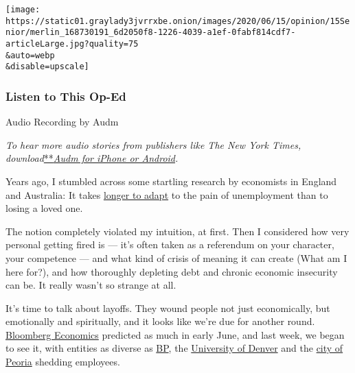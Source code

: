 \texttt{[image: https://static01.graylady3jvrrxbe.onion/images/2020/06/15/opinion/15Senior/merlin\_168730191\_6d2050f8-1226-4039-a1ef-0fabf814cdf7-articleLarge.jpg?quality=75\\\&auto=webp\\\&disable=upscale]}

\hypertarget{listen-to-this-op-ed}{%
\subsubsection{Listen to This Op-Ed}\label{listen-to-this-op-ed}}

Audio Recording by Audm

\emph{To hear more audio stories from publishers like The New York
Times,
download}\href{https://www.audm.com/?utm_source=nytmag\&utm_medium=embed\&utm_campaign=left_behind_draper}{**}\href{https://www.audm.com/?utm_source=nytopinion\&utm_medium=embed\&utm_campaign=more_fired_pandemic}{\emph{Audm
for iPhone or Android}}\emph{.}

Years ago, I stumbled across some startling research by economists in
England and Australia: It takes
\href{https://books.google.com/books?id=E1Ic-dZtrBIC\&pg=PT101\&lpg=PT101\&dq=andrew+oswald+unemployment+death+of+a+spouse\&source=bl\&ots=gfUL7Y4GvI\&sig=ACfU3U2KXUi5OPsW78e0CwyFsEdFNB6aZg\&hl=en\&sa=X\&ved=2ahUKEwie2qna_P7pAhWuTTABHfoIBmwQ6AEwBnoECAgQAQ\#v=onepage\&q=andrew\%20oswald\%20unemployment\%20death\%20of\%20a\%20spouse\&f=false}{longer
to adapt} to the pain of unemployment than to losing a loved one.

The notion completely violated my intuition, at first. Then I considered
how very personal getting fired is --- it's often taken as a referendum
on your character, your competence --- and what kind of crisis of
meaning it can create (What am I here for?), and how thoroughly
depleting debt and chronic economic insecurity can be. It really wasn't
so strange at all.

It's time to talk about layoffs. They wound people not just
economically, but emotionally and spiritually, and it looks like we're
due for another round.
\href{https://www.bloomberg.com/graphics/2020-how-many-more-jobs-will-be-lost/}{Bloomberg
Economics} predicted as much in early June, and last week, we began to
see it, with entities as diverse as
\href{https://www.reuters.com/article/us-bp-jobs-exclusive/exclusive-bp-to-cut-15-of-workforce-sources-idUSKBN23F1D9}{BP},
the
\href{https://www.denverpost.com/2020/06/09/university-denver-layoffs-salary-cuts-covid/}{University
of Denver} and the
\href{https://week.com/2020/06/09/peoria-city-council-makes-first-round-of-job-cuts/}{city
of Peoria} shedding employees.


